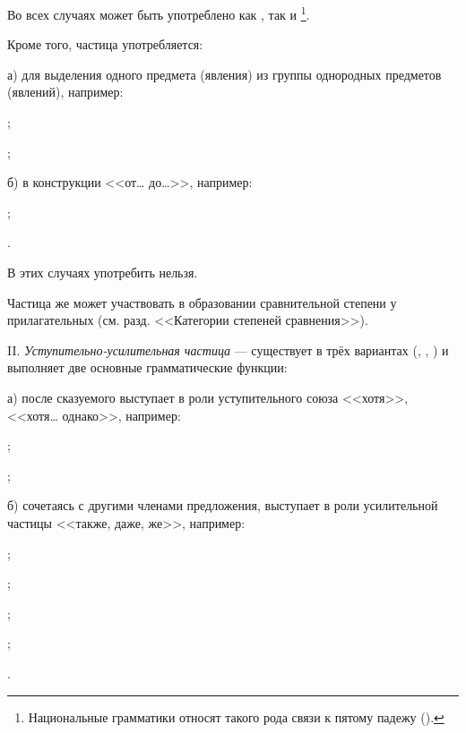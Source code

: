 Во всех случаях может быть употреблено как , так и \footnote[48]{Национальные грамматики относят такого рода связи к пятому падежу ().}.

Кроме того, частица  употребляется:

а) для выделения одного предмета (явления) из группы однородных предметов (явлений), например:
\begin{prfsample}
	\item {};
	\item {};
\end{prfsample}

б) в конструкции <<от\ldots{} до\ldots{}>>, например:
\begin{prfsample}
	\item {};
	\item {}.
\end{prfsample}
В этих случаях  употребить нельзя.

Частица же  может участвовать в образовании сравнительной степени у прилагательных (см. разд. <<Категории степеней сравнения>>).

II. \emph{Уступительно-усилительная частица} --- существует в трёх вариантах (, , ) и выполняет две основные грамматические функции:

а) после сказуемого выступает в роли уступительного союза <<хотя>>, <<хотя\ldots{} однако>>, например:
\begin{prfsample}
	\item {};
	\item {};
\end{prfsample}

б) сочетаясь с другими членами предложения, выступает в роли усилительной частицы <<также, даже, же>>, например:
\begin{prfsample}
	\item {};
	\item {};
	\item {};
	\item {};
	\item {}.
\end{prfsample}

